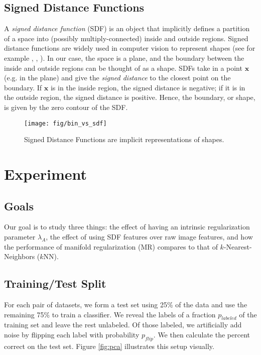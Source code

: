 \documentclass[anon,11pt]{9520} %
\newcommand{\mb}{\mathbf}
\begin{document}
\subsection{Signed Distance Functions} 
A {\em signed distance function} (SDF) is an object that implicitly defines a
partition of a space into (possibly multiply-connected) inside and outside
regions. Signed distance functions are widely used in computer vision to
represent shapes (see for example \cite{sdf}, \cite{Tsai1}, \cite{Tsai2}). In our case, the space is a plane,
and the boundary between the inside and outside regions can be thought of as a
shape. SDFs take in a point $\mb{x}$ (e.g. in the plane) and give the {\em
  signed distance} to the closest point on the boundary. If $\mb{x}$ is in the
inside region, the signed distance is negative; if it is in the outside region,
the signed distance is positive. Hence, the boundary, or shape, is given by the
zero contour of the SDF.
\begin{figure}[h!]
\begin{center}
\texttt{[image: fig/bin\_vs\_sdf]}
\end{center}
\caption{\label{fig:bin_vs_sdf} Signed Distance Functions are implicit representations of shapes.}
\end{figure}

\section{Experiment}
\subsection{Goals}
\label{sec:goals}
Our goal is to study three things: the effect of having an intrinsic
regularization parameter $\lambda_A$, the effect of using SDF features over raw
image features, and how the performance of manifold regularization (MR) compares
to that of $k$-Nearest-Neighbors ($k$NN).

\subsection{Training/Test Split}
For each pair of datasets, we form a test set using 25\% of the data and use the
remaining 75\% to train a classifier. We reveal the labels of a fraction
$p_{labeled}$ of the training set and leave the rest unlabeled. Of those
labeled, we artificially add noise by flipping each label with probability
$p_{flip}$. We then calculate the percent correct on the test set. Figure \ref{fig:pca} illustrates this setup visually.
\end{document}
